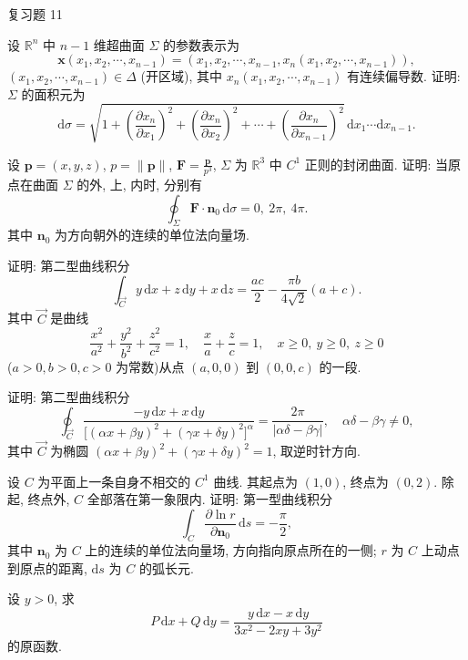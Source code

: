 \begin{exblock}{复习题 11}
\item 设 $\mathbb{R}^{n}$ 中 $n-1$ 维超曲面 $\Sigma$ 的参数表示为
\[
\boldsymbol{x}(x_{1},x_{2},\cdots,x_{n-1})=(x_{1},x_{2},\cdots,x_{n-1},x_{n}(x_{1},x_{2},\cdots,x_{n-1})),
\]
$(x_{1},x_{2},\cdots,x_{n-1})\in\Delta$ (开区域), 其中 $x_{n}(x_{1},x_{2},\cdots,x_{n-1})$ 有连续偏导数. 证明: $\Sigma$ 的面积元为
\[
\mathrm{d}\sigma=\sqrt{1+\left(\frac{\partial x_{n}}{\partial x_{1}}\right)^{2}+\left(\frac{\partial x_{n}}{\partial x_{2}}\right)^{2}+\cdots+\left(\frac{\partial x_{n}}{\partial x_{n-1}}\right)^{2}}\,\mathrm{d}x_{1}\cdots\mathrm{d}x_{n-1}.
\]

\item 设 $\boldsymbol{p}=(x,y,z)$, $p=\|\boldsymbol{p}\|$, $\boldsymbol{F}=\frac{\boldsymbol{p}}{p^{3}}$, $\Sigma$ 为 $\mathbb{R}^{3}$ 中 $C^{1}$ 正则的封闭曲面. 证明: 当原点在曲面 $\Sigma$ 的外, 上, 内时, 分别有
\[
\oint_{\Sigma}\boldsymbol{F}\cdot\boldsymbol{n}_{0}\,\mathrm{d}\sigma=0,\ 2\pi,\ 4\pi.
\]
其中 $\boldsymbol{n}_{0}$ 为方向朝外的连续的单位法向量场.

\item 证明: 第二型曲线积分
\[
\int_{\overrightarrow{C}}y\,\mathrm{d}x+z\,\mathrm{d}y+x\,\mathrm{d}z=\frac{ac}{2}-\frac{\pi b}{4\sqrt{2}}(a+c).
\]
其中 $\overrightarrow{C}$ 是曲线
\[
\frac{x^{2}}{a^{2}}+\frac{y^{2}}{b^{2}}+\frac{z^{2}}{c^{2}}=1,\quad\frac{x}{a}+\frac{z}{c}=1,\quad x\geqslant0,\ y\geqslant0,\ z\geqslant0
\]
($a>0,b>0,c>0$ 为常数)从点 $(a,0,0)$ 到 $(0,0,c)$ 的一段.

\item 证明: 第二型曲线积分
\[
\oint_{\overrightarrow{C}}\frac{-y\,\mathrm{d}x+x\,\mathrm{d}y}{\bigl[(\alpha x+\beta y)^{2}+(\gamma x+\delta y)^{2}\bigr]^{\alpha}}=\frac{2\pi}{|\alpha\delta-\beta\gamma|},\quad\alpha\delta-\beta\gamma\neq0,
\]
其中 $\overrightarrow{C}$ 为椭圆 $(\alpha x+\beta y)^{2}+(\gamma x+\delta y)^{2}=1$, 取逆时针方向.

\item 设 $C$ 为平面上一条自身不相交的 $C^{1}$ 曲线. 其起点为 $(1,0)$, 终点为 $(0,2)$. 除起, 终点外, $C$ 全部落在第一象限内. 证明: 第一型曲线积分
\[
\int_{C}\frac{\partial\ln r}{\partial\boldsymbol{n}_{0}}\,\mathrm{d}s=-\frac{\pi}{2},
\]
其中 $\boldsymbol{n}_{0}$ 为 $C$ 上的连续的单位法向量场, 方向指向原点所在的一侧; $r$ 为 $C$ 上动点到原点的距离, $\mathrm{d}s$ 为 $C$ 的弧长元.

\item 设 $y>0$, 求
\[
P\,\mathrm{d}x+Q\,\mathrm{d}y=\frac{y\,\mathrm{d}x-x\,\mathrm{d}y}{3x^{2}-2xy+3y^{2}}
\]
的原函数.


\end{exblock}
